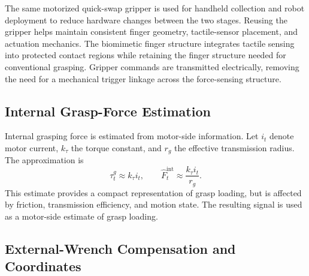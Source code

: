 The same motorized quick-swap gripper is used for handheld collection and robot deployment to reduce hardware changes between the two stages.
Reusing the gripper helps maintain consistent finger geometry, tactile-sensor placement, and actuation mechanics.
The biomimetic finger structure integrates tactile sensing into protected contact regions while retaining the finger structure needed for conventional grasping.
Gripper commands are transmitted electrically, removing the need for a mechanical trigger linkage across the force-sensing structure.

\subsection{Internal Grasp-Force Estimation}

Internal grasping force is estimated from motor-side information.
Let $i_t$ denote motor current, $k_{\tau}$ the torque constant, and $r_g$ the effective transmission radius. The approximation is
\begin{equation}
    \tau_t^g \approx k_{\tau} i_t,
    \qquad
    \widehat{F}_t^{\mathrm{int}}
    \approx \frac{k_{\tau} i_t}{r_g}.
    \label{eq:grasp_force_estimate}
\end{equation}
This estimate provides a compact representation of grasp loading, but is affected by friction, transmission efficiency, and motion state.
The resulting signal is used as a motor-side estimate of grasp loading.

\subsection{External-Wrench Compensation and Coordinates}

